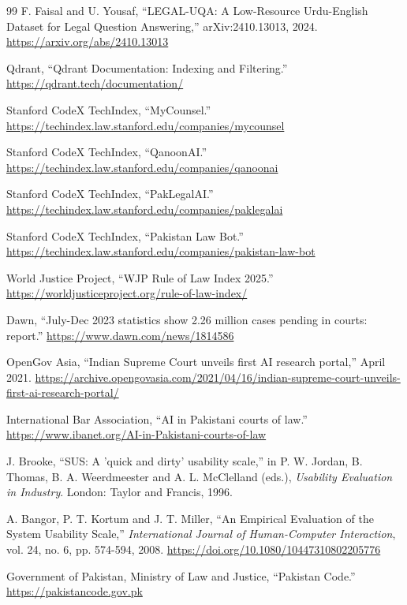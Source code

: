 \begin{thebibliography}{99}
 F. Faisal and U. Yousaf, ``LEGAL-UQA: A Low-Resource Urdu-English Dataset for Legal Question Answering,'' arXiv:2410.13013, 2024. \url{https://arxiv.org/abs/2410.13013}

 Qdrant, ``Qdrant Documentation: Indexing and Filtering.'' \url{https://qdrant.tech/documentation/}

 Stanford CodeX TechIndex, ``MyCounsel.'' \url{https://techindex.law.stanford.edu/companies/mycounsel}

 Stanford CodeX TechIndex, ``QanoonAI.'' \url{https://techindex.law.stanford.edu/companies/qanoonai}

 Stanford CodeX TechIndex, ``PakLegalAI.'' \url{https://techindex.law.stanford.edu/companies/paklegalai}

 Stanford CodeX TechIndex, ``Pakistan Law Bot.'' \url{https://techindex.law.stanford.edu/companies/pakistan-law-bot}

 World Justice Project, ``WJP Rule of Law Index 2025.'' \url{https://worldjusticeproject.org/rule-of-law-index/}

 Dawn, ``July-Dec 2023 statistics show 2.26 million cases pending in courts: report.'' \url{https://www.dawn.com/news/1814586}

 OpenGov Asia, ``Indian Supreme Court unveils first AI research portal,'' April 2021. \url{https://archive.opengovasia.com/2021/04/16/indian-supreme-court-unveils-first-ai-research-portal/}

 International Bar Association, ``AI in Pakistani courts of law.'' \url{https://www.ibanet.org/AI-in-Pakistani-courts-of-law}

 J. Brooke, ``SUS: A 'quick and dirty' usability scale,'' in P. W. Jordan, B. Thomas, B. A. Weerdmeester and A. L. McClelland (eds.), \emph{Usability Evaluation in Industry}. London: Taylor and Francis, 1996.

 A. Bangor, P. T. Kortum and J. T. Miller, ``An Empirical Evaluation of the System Usability Scale,'' \emph{International Journal of Human-Computer Interaction}, vol. 24, no. 6, pp. 574-594, 2008. \url{https://doi.org/10.1080/10447310802205776}

 Government of Pakistan, Ministry of Law and Justice, ``Pakistan Code.'' \url{https://pakistancode.gov.pk}

\end{thebibliography}
